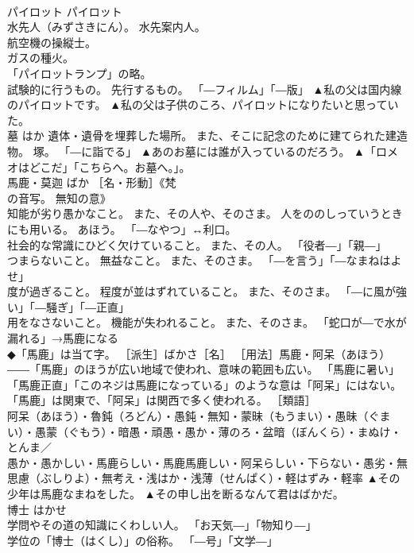 \documentclass[8pt]{extreport}
\begin{document}
\begin{CJK}{UTF8}{min}
\\	パイロット	パイロット	
\\	水先人（みずさきにん）。 水先案内人。 
\\	航空機の操縦士。 
\\	ガスの種火。 
\\	「パイロットランプ」の略。 
\\	試験的に行うもの。 先行するもの。 「―フィルム」「―版」	▲私の父は国内線のパイロットです。 ▲私の父は子供のころ、パイロットになりたいと思っていた。
\\	墓	はか	遺体・遺骨を埋葬した場所。 また、そこに記念のために建てられた建造物。 塚。 「―に詣でる」	▲あのお墓には誰が入っているのだろう。 ▲「ロメオはどこだ」「こちらへ。お墓へ。」。
\\	馬鹿・莫迦	ばか	［名・形動］《梵
\\	の音写。 無知の意》 
\\	知能が劣り愚かなこと。 また、その人や、そのさま。 人をののしっていうときにも用いる。 あほう。 「―なやつ」↔利口。 
\\	社会的な常識にひどく欠けていること。 また、その人。 「役者―」「親―」 
\\	つまらないこと。 無益なこと。 また、そのさま。 「―を言う」「―なまねはよせ」 
\\	度が過ぎること。 程度が並はずれていること。 また、そのさま。 「―に風が強い」「―騒ぎ」「―正直」 
\\	用をなさないこと。 機能が失われること。 また、そのさま。 「蛇口が―で水が漏れる」→馬鹿になる 
\\	◆「馬鹿」は当て字。 ［派生］ばかさ［名］ ［用法］馬鹿・阿呆（あほう）――「馬鹿」のほうが広い地域で使われ、意味の範囲も広い。 「馬鹿に暑い」「馬鹿正直」「このネジは馬鹿になっている」のような意は「阿呆」にはない。 
\\	「馬鹿」は関東で、「阿呆」は関西で多く使われる。 ［類語］
\\	阿呆（あほう）・魯鈍（ろどん）・愚鈍・無知・蒙昧（もうまい）・愚昧（ぐまい）・愚蒙（ぐもう）・暗愚・頑愚・愚か・薄のろ・盆暗（ぼんくら）・まぬけ・とんま／
\\	愚か・愚かしい・馬鹿らしい・馬鹿馬鹿しい・阿呆らしい・下らない・愚劣・無思慮（ぶしりよ）・無考え・浅はか・浅薄（せんぱく）・軽はずみ・軽率	▲その少年は馬鹿なまねをした。 ▲その申し出を断るなんて君はばかだ。
\\	博士	はかせ	
\\	学問やその道の知識にくわしい人。 「お天気―」「物知り―」 
\\	学位の「博士（はくし）」の俗称。 「―号」「文学―」 

\end{CJK}
\end{document}
